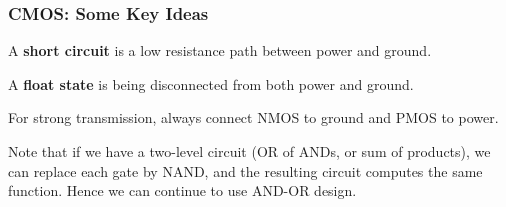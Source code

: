 




\begin{frame}\frametitle{CMOS: Some Key Ideas}

A \textbf{short circuit} is a low resistance path between power and ground.
\hfill\break

A \textbf{float state} is being disconnected from both power and ground.
\hfill\break

For strong transmission, always connect NMOS to ground and PMOS to power.
\hfill\break

Note that if we have a two-level circuit (OR of ANDs, or sum of products), we can replace
each gate by NAND, and the resulting circuit computes the same function. Hence we can continue to use AND-OR design.

\end{frame}





	
